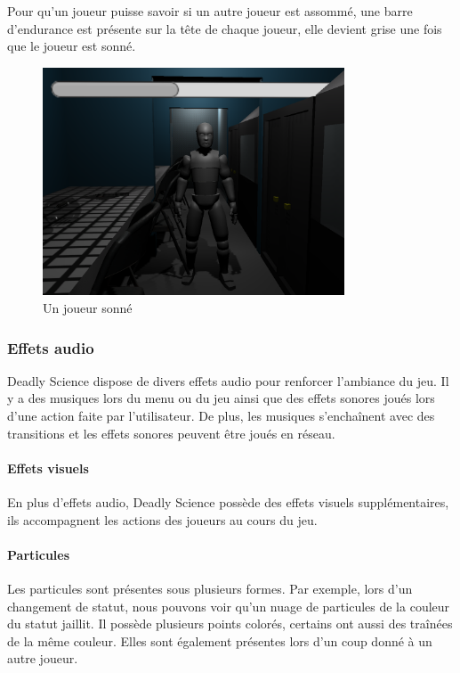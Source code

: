 \documentclass{article}
\begin{document}
Pour qu'un joueur puisse savoir si un autre joueur est assommé, une barre d'endurance est présente sur la tête de chaque joueur, elle devient grise une fois que le joueur est sonné.


\begin{figure}[H]
\centering
\includegraphics[width=0.8\textwidth]{cc/stamina_stunned.png}
\caption{Un joueur sonné}
\label{cc_b}
\end{figure}


\subsubsection{Effets audio}


Deadly Science dispose de divers effets audio pour renforcer l'ambiance du jeu.
Il y a des musiques lors du menu ou du jeu ainsi que des effets sonores joués lors d'une action faite par l'utilisateur. 
De plus, les musiques s'enchaînent avec des transitions et les effets sonores peuvent être joués en réseau.


\paragraph{Effets visuels}


En plus d'effets audio, Deadly Science possède des effets visuels supplémentaires, ils accompagnent les actions des joueurs au cours du jeu.


\paragraph{Particules}


Les particules sont présentes sous plusieurs formes.
Par exemple, lors d'un changement de statut, nous pouvons voir qu'un nuage de particules de la couleur du statut jaillit. Il possède plusieurs points colorés, certains ont aussi des traînées de la même couleur.
Elles sont également présentes lors d'un coup donné à un autre joueur.
\end{document}
